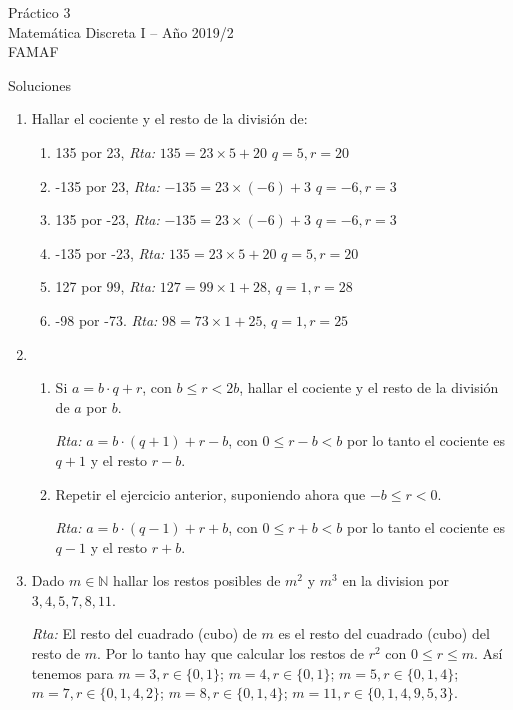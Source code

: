 \documentclass[12pt,spanish,makeidx]{amsbook}
\newcommand{\rta}{\noindent\textit{Rta: }}
\begin{document}
	
{\bf \begin{center} Práctico 3 \\ Matemática Discreta I -- Año 2019/2 \\ FAMAF \end{center}}

{\bf \begin{center} Soluciones \end{center}}

\smallskip
\begin{enumerate}

\item Hallar el cociente y el resto de la divisi\'on de:
\begin{enumerate}
\item 
135 por 23, \rta $135= 23\times 5 +20$ $q=5, r=20$
\item
-135 por 23, \rta $-135= 23\times (-6) +3$ $q=-6, r=3$
\item
135 por -23, \rta $ -135= 23\times (-6) +3$ $q=-6, r=3$
\item
-135 por -23, \rta $135= 23\times 5 +20$ $q=5, r=20$
\item
127 por 99, \rta $127=99\times1+28$, $q=1, r=28$
\item
-98 por -73. \rta $ 98=73\times 1+25$, $q=1, r=25$
\end{enumerate}
\smallskip

\item 
\begin{enumerate}
	\item Si $a=b\cdot q+r$, con $b \le r <2 b$, hallar el cociente y el resto de la divisi\'on de $a$ por $b$.
	
	\rta $a = b \cdot (q+1) + r-b$, con $0 \le r-b < b$ por lo tanto el cociente es $q+1$ y el resto  $r-b$.
	
	
	\item Repetir el ejercicio anterior, suponiendo ahora que $-b \le r < 0$.  
	
	\rta  $a = b \cdot (q-1) + r+b$, con $0 \le r+b < b$ por lo tanto el cociente es $q-1$ y el resto  $r+b$.
\end{enumerate}


\smallskip
\item Dado $m\in \mathbb N$ hallar los restos posibles de $m^2$ y $m^3$ en la division por $3,4,5,7,8, 11$.


\rta El resto del cuadrado (cubo)  de $m$ es el resto del cuadrado (cubo)  del resto de $m$.
Por lo tanto hay que calcular los restos de $r^2$ con $0\le r\le m$.
Así tenemos para $m=3, r\in\{0, 1\}$; $m=4, r\in\{0,1\}$; $m=5, r\in\{0,1,4\}$; $m=7,r\in\{0,1,4,2\}$;
$m=8, r\in\{0,1,4\}$; $m=11, r\in\{0,1,4,9,5,3\}$.


\end{enumerate}
\end{document}
